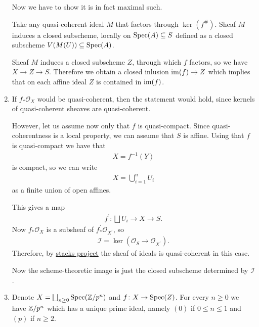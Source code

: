 \begin{exercise}{4}
\begin{enumerate}
{            Now we have to show it is in fact maximal such.

            Take any quasi-coherent ideal $M$ that factors through $\ker(f^\#)$.
            Sheaf $M$ induces a closed subscheme, locally on $\operatorname{Spec}(A) \subseteq
            S$ defined as a closed subscheme $V(M(U)) \subseteq \operatorname{Spec}(A)$.

            Sheaf $M$ induces a closed subscheme $Z$, through which $f$ factors,
            so we have $X \to Z \to S$. Therefore we obtain a closed inlusion $\operatorname{im}(f) \to
            Z$ which implies that on each affine ideal $Z$ is contained in
            $\operatorname{im}(f)$.
            }
        \item{
            If $f_* \mathcal{O}_X$ would be quasi-coherent, then the statement
            would hold, since kernels of quasi-coherent sheaves are
            quasi-coherent.

            However, let us assume now only that $f$ is quasi-compact.
            Since quasi-coherentness is a local property, we can assume that $S$ is affine.
            Using that $f$ is quasi-compact we have that
            \begin{align*}
                X=f^{-1}(Y)
            \end{align*}
            is compact, so we can write 
            \begin{align*}
                X=\bigcup_{i=1}^n U_i
            \end{align*}
            as a finite union of open affines.

            This gives a map 
            \begin{align*}
                f^{\prime}:\bigsqcup U_i \to X \to S.
            \end{align*}
            Now $f_*\mathcal{O}_X$ is a subsheaf of $f^{\prime}_*\mathcal{O}_{X^\prime}$,
            so 
            \begin{align*}
                \mathcal{I}=\ker(\mathcal{O}_S \to \mathcal{O}_{X^\prime}).
            \end{align*}
            Therefore, by \href{https://stacks.math.columbia.edu/tag/01LC}{stacks project}
            the sheaf of ideals is quasi-coherent in this case.

            Now the scheme-theoretic image is just the closed subscheme determined by $\mathcal{I}$.
            }
        \item{
            Denote $X = \bigsqcup_{n \geq 0} \operatorname{Spec}(\mathbb{Z} / p^n)$ and $f \colon X
            \to \operatorname{Spec}(Z)$.
            For every $n \geq 0$ we have $\mathbb{Z}/p^n$ which has a unique prime
            ideal, namely $(0)$ if $0 \leq n \leq 1$ and $(p)$ if $n \geq 2$.

}
\end{enumerate}
\end{exercise}
